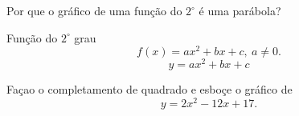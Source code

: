 \begin{frame}[label=conicas]{Por que o gráfico de uma função do $2^\circ$ é uma parábola?}
\begin{block}{Função do $2^\circ$ grau}
	\[f(x)=ax^2+bx+c, \ a\neq 0.\]
	\[y=ax^2+bx+c\]
\end{block}

\begin{exe}
Façao o completamento de quadrado e esboçe o gráfico de  
\[y=2x^2-12x+17.\]
\end{exe}

\end{frame}





